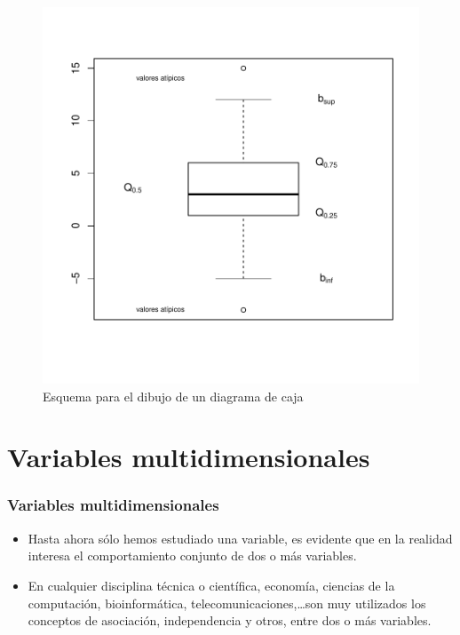 \begin{frame}
\begin{center}
\begin{figure}\label{boxplot}
\includegraphics{./dibujos/01/-014}
\caption{Esquema para el dibujo de un diagrama de caja}
\end{figure}
\end{center}

\end{frame}



\section{Variables multidimensionales}

\begin{frame}
\frametitle{Variables multidimensionales}
\begin{itemize}
\item Hasta ahora sólo hemos estudiado una variable, es evidente que en la realidad interesa el
comportamiento conjunto de dos o más variables.
\item  En cualquier disciplina técnica o
científica, economía, ciencias de la computación, bioinformática,
telecomunicaciones,\ldots son muy utilizados los conceptos de asociación, independencia y
otros, entre dos o más variables.
\end{itemize}
\end{frame}

